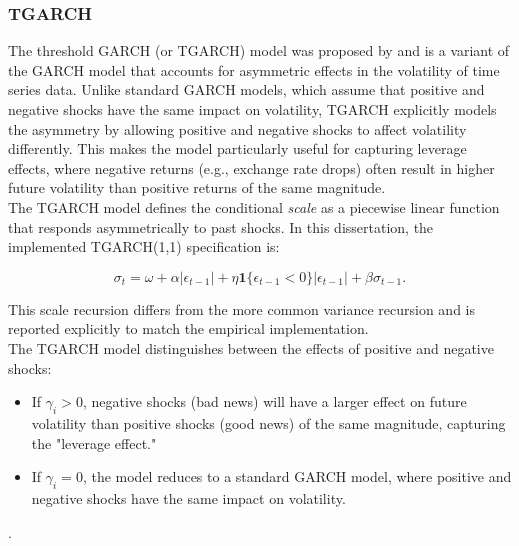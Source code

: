 \documentclass[oneside,12pt]{CUEDthesisPSnPDF}
\newcommand{\textcite}{\citet}
\begin{document}

\subsubsection{TGARCH}
\noindent 
The threshold GARCH (or TGARCH) model was proposed by \textcite{zakoian1994threshold} and is a variant of the GARCH model that accounts for asymmetric effects in the volatility of time series data. Unlike standard GARCH models, which assume that positive and negative shocks have the same impact on volatility, TGARCH explicitly models the asymmetry by allowing positive and negative shocks to affect volatility differently. This makes the model particularly useful for capturing leverage effects, where negative returns (e.g., exchange rate drops) often result in higher future volatility than positive returns of the same magnitude.\\

The TGARCH model defines the conditional \emph{scale} as a piecewise linear function that responds asymmetrically to past shocks. In this dissertation, the implemented TGARCH(1,1) specification is:

\begin{equation}
\sigma_t = \omega + \alpha |\epsilon_{t-1}| + \eta \mathbf{1}\{\epsilon_{t-1}<0\}|\epsilon_{t-1}| + \beta \sigma_{t-1}.
\end{equation}

This scale recursion differs from the more common variance recursion and is reported explicitly to match the empirical implementation.\\

The TGARCH model distinguishes between the effects of positive and negative shocks:
\begin{itemize}
    \item If \( \gamma_{i} > 0 \), negative shocks (bad news) will have a larger effect on future volatility than positive shocks (good news) of the same magnitude, capturing the "leverage effect."
    \item If \( \gamma_{i} = 0 \), the model reduces to a standard GARCH model, where positive and negative shocks have the same impact on volatility.
\end{itemize}.

\end{document}
